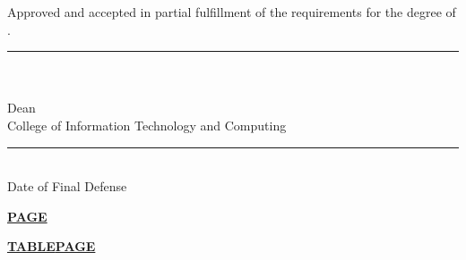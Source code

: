\vspace{1.5\baselineskip}
\noindent Approved and accepted in partial fulfillment of the requirements for
the degree of \citcDegree.

\vspace{1.5\baselineskip}
\begin{center}
\rule{7.5cm}{0.4pt}\\
\textbf{\citcDean}\\
Dean\\
College of Information Technology and Computing
\end{center}

\vspace{1\baselineskip}
\noindent\rule{6cm}{0.4pt}\\
Date of Final Defense


\citcAcknowledgement

\ifcitcdedication
{}

\citcDedication
\fi

\fi %

\vspace{-2\baselineskip}
\hfill\underline{\textbf{PAGE}}\par
\vspace{2\baselineskip}
{\renewcommand{\contentsname}{}\vspace{-3\baselineskip}\tableofcontents}

\vspace{-2\baselineskip}
\noindent\underline{\textbf{TABLE}}\hfill\underline{\textbf{PAGE}}\par
\vspace{2\baselineskip}
{\renewcommand{\listtablename}{}\vspace{-3\baselineskip}\listoftables}

